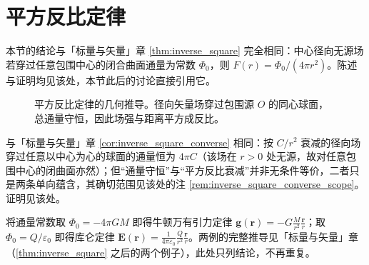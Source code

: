 \section{平方反比定律}

\begin{remark}\label{thm:inverse_square_vector}
本节的结论与「标量与矢量」章 \cref{thm:inverse_square} 完全相同：中心径向无源场若穿过任意包围中心的闭合曲面通量为常数 $\Phi_0$，则 $F(r) = \Phi_0/(4\pi r^2)$。陈述与证明均见该处，本节此后的讨论直接引用它。
\end{remark}

\begin{figure}[htbp]
    \centering
    \caption{平方反比定律的几何推导。径向矢量场穿过包围源 $O$ 的同心球面，总通量守恒，因此场强与距离平方成反比。}
    \label{fig:inverse_square}
\end{figure}

\begin{remark}\label{cor:inverse_square_converse_vector}
与「标量与矢量」章 \cref{cor:inverse_square_converse} 相同：按 $C/r^2$ 衰减的径向场穿过任意以中心为心的球面的通量恒为 $4\pi C$（该场在 $r>0$ 处无源，故对任意包围中心的闭曲面亦然）；但“通量守恒”与“平方反比衰减”并非无条件等价，二者只是两条单向蕴含，其确切范围见该处的注 \ref{rem:inverse_square_converse_scope}。证明见该处。
\end{remark}

\begin{remark}
将通量常数取 $\Phi_0 = -4\pi GM$ 即得牛顿万有引力定律 $\mathbf{g}(\mathbf{r}) = -G\frac{M}{r^2}\frac{\mathbf{r}}{r}$；取 $\Phi_0 = Q/\varepsilon_0$ 即得库仑定律 $\mathbf{E}(\mathbf{r}) = \frac{1}{4\pi\varepsilon_0}\frac{Q}{r^2}\frac{\mathbf{r}}{r}$。两例的完整推导见「标量与矢量」章（\cref{thm:inverse_square} 之后的两个例子），此处只列结论，不再重复。
\end{remark}

